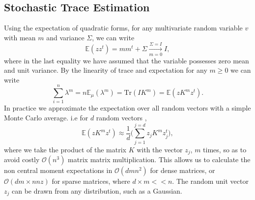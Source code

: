 \documentclass[letterpaper]{article} %
\begin{document}
\subsection{Stochastic Trace Estimation}
\label{stochastictrace}
Using the expectation of quadratic forms, for any multivariate random variable $v$ with mean $m$ and variance $\Sigma$, we can write 
\begin{equation}
\mathbb{E}(zz^{t}) = mm^{t}+\Sigma \xrightarrow[m = 0]{\Sigma = I} I,
\end{equation}
where in the last equality we have assumed that the variable possesses zero mean and unit variance. By the linearity of trace and expectation for any $m\geq 0$ we can write
\begin{equation}
\sum_{i=1}^{n}\lambda^{m} = n\mathbb{E}_{\mu}(\lambda^{m}) = \text{Tr}(IK^{m}) = \mathbb{E}(zK^{m}z^{t}).
\end{equation}
In practice we approximate the expectation over all random vectors with a simple Monte Carlo average. i.e for $d$ random vectors ,
\begin{equation}
\mathbb{E}(zK^{m}z^{t}) \approx \frac{1}{d}\bigg(\sum_{j=1}^{j=d}z_{j}K^{m}z_{j}^{t} \bigg),
\end{equation}
where we take the product of the matrix $K$ with the vector $z_{j}$, $m$ times, so as to avoid costly $\mathcal{O}(n^{3})$ matrix matrix multiplication. This allows us to calculate the non central moment expectations in $\mathcal{O}(dmn^{2})$ for dense matrices, or $\mathcal{O}(dm\times nnz)$ for sparse matrices, where $d\times m << n$. The random unit vector $z_{j}$ can be drawn from any distribution, such as a Gaussian. 






\end{document}
